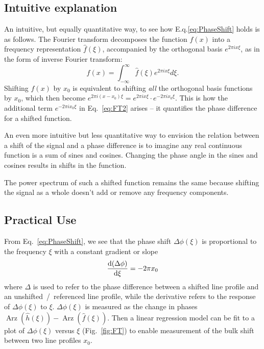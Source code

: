 \subsection{Intuitive explanation}

An intuitive, but equally quantitative way, to see how E.q.\ref{eq:PhaseShift} holds is as follows. The Fourier transform decomposes the function $f(x)$ into a frequency representation $\hat{f}(\xi)$, accompanied by the orthogonal basis $e^{2 \pi ix \xi}$, as in the form of inverse Fourier transform: 
\begin{equation}
	f(x) = \int_{-\infty}^{\infty} \hat{f}(\xi) e^{2 \pi ix \xi} d\xi. 
\end{equation}
Shifting $f(x)$ by $x_0$ is equivalent to shifting \textit{all} the orthogonal basis functions by $x_0$, which then become $e^{2 \pi i(x-x_0) \xi} = e^{2 \pi i x \xi} \cdot e^{-2 \pi ix_0 \xi}$. This is how the additional term $e^{-2 \pi ix_0 \xi}$ in Eq.~\ref{eq:FT2} arises -- it quantifies the phase difference for a shifted function. 

An even more intuitive but less quantitative way to envision the relation between a shift of the signal and a phase difference is to imagine any real continuous function is a sum of sines and cosines. Changing the phase angle in the sines and cosines results in shifts in the function. 

The power spectrum of such a shifted function remains the same because shifting the signal as a whole doesn't add or remove any frequency components. 


\subsection{Practical Use}

From Eq.~\ref{eq:PhaseShift}, we see that the phase shift $\Delta \phi(\xi)$ is proportional to the frequency $\xi$ with a constant gradient or slope
\begin{equation}
	\dv{(\Delta \phi)}{\xi} = -2 \pi x_0
\label{eq:gradient}
\end{equation}
where $\Delta$ is used to refer to the phase difference between a shifted line profile and an unshifted~/~referenced line profile, while the derivative refers to the response of $\Delta \phi(\xi)$ to $\xi$. $\Delta \phi(\xi)$ is measured as the change in phases $\operatorname{Arz}(\hat{h}(\xi)) - \operatorname{Arz}(\hat{f}(\xi))$. Then a linear regression model can be fit to a plot of $\Delta \phi(\xi)$ versus $\xi$ (Fig.~\ref{fig:FT}) to enable measurement of the bulk shift between two line profiles $x_0$. 

